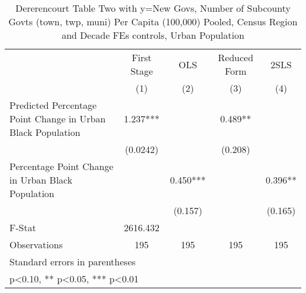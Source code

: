 \begin{table}[htbp]\centering
\def\sym#1{\ifmmode^{#1}\else\(^{#1}\)\fi}
\caption{Dererencourt Table Two with y=New Govs, Number of Subcounty Govts (town, twp, muni) Per Capita (100,000) Pooled, Census Region and Decade FEs controls, Urban Population}
\begin{tabular}{l*{4}{c}}
\toprule
                    & First Stage   &         OLS   &Reduced Form   &        2SLS   \\
                    &\multicolumn{1}{c}{(1)}   &\multicolumn{1}{c}{(2)}   &\multicolumn{1}{c}{(3)}   &\multicolumn{1}{c}{(4)}   \\
\midrule
Predicted Percentage Point Change in Urban Black Population&       1.237***&               &       0.489** &               \\
                    &    (0.0242)   &               &     (0.208)   &               \\
\addlinespace
Percentage Point Change in Urban Black Population&               &       0.450***&               &       0.396** \\
                    &               &     (0.157)   &               &     (0.165)   \\
\midrule
F-Stat              &    2616.432   &               &               &               \\
Observations        &         195   &         195   &         195   &         195   \\
\bottomrule
\multicolumn{5}{l}{\footnotesize Standard errors in parentheses}\\
\multicolumn{5}{l}{\footnotesize * p<0.10, ** p<0.05, *** p<0.01}\\
\end{tabular}
\end{table}
